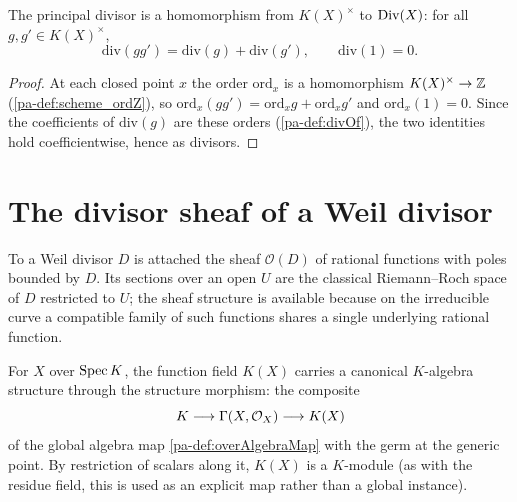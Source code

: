 \begin{theorem}
  \label{pa-thm:divOf_hom}
  \leanok

  The principal divisor is a homomorphism from \(K(X)^\times\) to \(\operatorname{Div}(X)\): for all
  \(g, g' \in K(X)^\times\),
  \[
    \mathrm{div}(g g') = \mathrm{div}(g) + \mathrm{div}(g'), \qquad \mathrm{div}(1) = 0 .
  \]
\end{theorem}
\begin{proof}
  \leanok
  At each closed point \(x\) the order \(\mathrm{ord}_x\) is a homomorphism \(K(X)^\times \to \mathbb{Z}\)
  (\ref{pa-def:scheme_ordZ}), so \(\mathrm{ord}_x(g g') = \mathrm{ord}_x g + \mathrm{ord}_x g'\) and
  \(\mathrm{ord}_x(1) = 0\). Since the coefficients of \(\mathrm{div}(g)\) are these orders
  (\ref{pa-def:divOf}), the two identities hold coefficientwise, hence as divisors.
\end{proof}

\section{The divisor sheaf of a Weil divisor}

To a Weil divisor \(D\) is attached the sheaf \(\mathcal O(D)\) of rational functions with poles
bounded by \(D\). Its sections over an open \(U\) are the classical Riemann--Roch space of \(D\)
restricted to \(U\); the sheaf structure is available because on the irreducible curve a compatible
family of such functions shares a single underlying rational function.

\begin{definition}
  \label{pa-def:functionFieldOverAlgebraMap}
  \leanok

  For \(X\) over \(\operatorname{Spec} K\), the function field \(K(X)\) carries a canonical \(K\)-algebra structure
  through the structure morphism: the composite
  \[
    K \longrightarrow \Gamma(X, \mathcal{O}_{X}) \longrightarrow K(X)
  \]
  of the global algebra map \ref{pa-def:overAlgebraMap} with the germ at the generic point. By
  restriction of scalars along it, \(K(X)\) is a \(K\)-module (as with the residue field, this is
  used as an explicit map rather than a global instance).
\end{definition}

